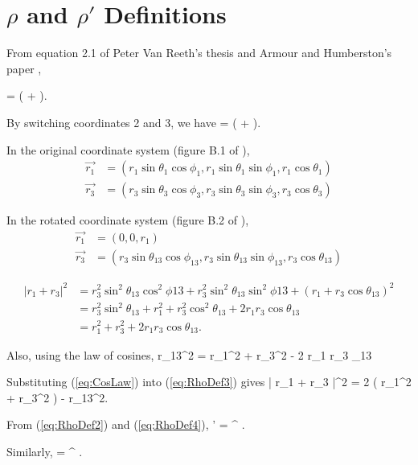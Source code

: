 \documentclass[main.tex]{subfiles}
\begin{document}
\newpage
\chapter{\texorpdfstring{$\rho$ and $\rho'$} {rho and rho'} Definitions}
\label{chp:RhoDef}
From equation 2.1 of Peter Van Reeth's thesis \cite{} and Armour and Humberston's paper \cite{},

\beq
\vec{\rho} =  \left(  +  \right).
\label{eq:RhoDef1}
\eeq

By switching coordinates 2 and 3, we have
\beq
{} =  \left(  +  \right).
\label{eq:RhoDef2}
\eeq

In the original coordinate system (figure B.1 of \cite{}),
\begin{align}
\nonumber \vec{r_1} &= \left( r_1 \sin \theta_1 \cos \phi_1, r_1 \sin \theta_1 \sin \phi_1, r_1 \cos \theta_1 \right) \\
\vec{r_3} &= \left( r_3 \sin \theta_3 \cos \phi_3, r_3 \sin \theta_3 \sin \phi_3, r_3 \cos \theta_3 \right)
\end{align}

In the rotated coordinate system (figure B.2 of \cite{}),
\begin{align}
\nonumber \vec{r_1} &= (0, 0, r_1) \\
\vec{r_3} &= \left( r_3 \sin \theta_{13} \cos \phi_{13}, r_3 \sin \theta_{13} \sin \phi_{13}, r_3 \cos \theta_{13} \right)
\end{align}

\begin{align}
\nonumber \left| r_1 + r_3 \right|^2 &= r_3^2 \sin^2 \theta_{13} \cos^2 \phi{13} + r_3^2 \sin^2 \theta_{13} \sin^2 \phi{13} + (r_1 + r_3 \cos \theta_{13})^2\\
\nonumber &= r_3^2 \sin^2 \theta_{13} + r_1^2 + r_3^2 \cos^2 \theta_{13} + 2 r_1 r_3 \cos \theta_{13} \\
&= r_1^2 + r_3^2 + 2 r_1 r_3 \cos \theta_{13}.
\label{eq:RhoDef3}
\end{align}

Also, using the law of cosines,
\beq
r_{13}^2 = r_1^2 + r_3^2 - 2 r_1 r_3 \cos \theta_{13}
\label{eq:CosLaw}
\eeq

Substituting (\ref{eq:CosLaw}) into (\ref{eq:RhoDef3}) gives
\beq
\left| r_1 + r_3 \right|^2 = 2 \left( r_1^2 + r_3^2 \right) - r_{13}^2.
\label{eq:RhoDef4}
\eeq

From (\ref{eq:RhoDef2}) and (\ref{eq:RhoDef4}),
\beq
\rho' =   ^ .
\eeq

Similarly,
\beq
\rho =   ^ .
\eeq
\end{document}

